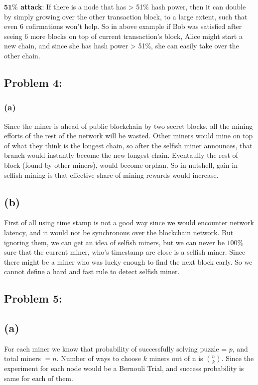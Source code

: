 \documentclass[a4paper]{article}
\begin{document}
\textbf{$\mathbf{51 \%}$ attack}: If there is a node that has > 51\% hash power, then it can double by
simply growing over the other transaction block, to a large extent, such that even 6 cofirmations won't help.
So in above example if Bob was satisfied after seeing 6 more blocks on top of current transaction's block, Alice
might start a new chain, and since she has hash power > 51\%, she can easily take over the other chain.

\subsection*{Problem 4:}
\subsubsection*{(a)}
Since the miner is ahead of public blockchain by two secret blocks, all the mining efforts of the rest of the network
will be wasted. Other miners would mine on top of what they think is the longest chain, so after the
selfish miner announces, that branch would instantly become the new longest chain. Eventaully 
the rest of block (found by other miners), would become orphan. So in nutshell, gain in selfish mining
is that effective share of mining rewards would increase.

\subsection*{(b)}
First of all using time stamp is not a good way since we would encounter network latency, and it would
not be synchronous over the blockchain network. But ignoring them, we can get an idea of selfish miners, but
we can never be $100\%$ sure that the current miner, who's timestamp are close is a selfish miner. Since there
might be a miner who was lucky enough to find the next block early. So we cannot define a hard and fast rule to detect
selfish miner.




\subsection*{Problem 5:}
\subsection*{(a)}
For each miner we know that probability of successfully solving puzzle = $p$, and total miners $=n$.
Number of ways to choose $k$ miners out of n is $n\choose k$.
Since the experiment for each node would be a Bernouli Trial, and success probability is same for each of them. \\
\end{document}
